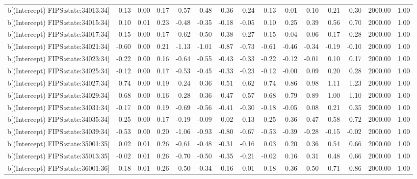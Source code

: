 \begin{table}[ht]
\begin{tabular}{rrrrrrrrrrrrrrr}
  b[(Intercept) FIPS:state:34013:34] & -0.13 & 0.00 & 0.17 & -0.57 & -0.48 & -0.36 & -0.24 & -0.13 & -0.01 & 0.10 & 0.21 & 0.30 & 2000.00 & 1.00 \\ 
  b[(Intercept) FIPS:state:34015:34] & 0.10 & 0.01 & 0.23 & -0.48 & -0.35 & -0.18 & -0.05 & 0.10 & 0.25 & 0.39 & 0.56 & 0.70 & 2000.00 & 1.00 \\ 
  b[(Intercept) FIPS:state:34017:34] & -0.15 & 0.00 & 0.17 & -0.62 & -0.50 & -0.38 & -0.27 & -0.15 & -0.04 & 0.06 & 0.17 & 0.28 & 2000.00 & 1.00 \\ 
  b[(Intercept) FIPS:state:34021:34] & -0.60 & 0.00 & 0.21 & -1.13 & -1.01 & -0.87 & -0.73 & -0.61 & -0.46 & -0.34 & -0.19 & -0.10 & 2000.00 & 1.00 \\ 
  b[(Intercept) FIPS:state:34023:34] & -0.22 & 0.00 & 0.16 & -0.64 & -0.55 & -0.43 & -0.33 & -0.22 & -0.12 & -0.01 & 0.10 & 0.17 & 2000.00 & 1.00 \\ 
  b[(Intercept) FIPS:state:34025:34] & -0.12 & 0.00 & 0.17 & -0.53 & -0.45 & -0.33 & -0.23 & -0.12 & -0.00 & 0.09 & 0.20 & 0.28 & 2000.00 & 1.00 \\ 
  b[(Intercept) FIPS:state:34027:34] & 0.74 & 0.00 & 0.19 & 0.24 & 0.36 & 0.51 & 0.62 & 0.74 & 0.86 & 0.98 & 1.11 & 1.23 & 2000.00 & 1.00 \\ 
  b[(Intercept) FIPS:state:34029:34] & 0.68 & 0.00 & 0.16 & 0.28 & 0.36 & 0.47 & 0.57 & 0.68 & 0.79 & 0.89 & 1.00 & 1.10 & 2000.00 & 1.00 \\ 
  b[(Intercept) FIPS:state:34031:34] & -0.17 & 0.00 & 0.19 & -0.69 & -0.56 & -0.41 & -0.30 & -0.18 & -0.05 & 0.08 & 0.21 & 0.35 & 2000.00 & 1.00 \\ 
  b[(Intercept) FIPS:state:34035:34] & 0.25 & 0.00 & 0.17 & -0.19 & -0.09 & 0.02 & 0.13 & 0.25 & 0.36 & 0.47 & 0.58 & 0.72 & 2000.00 & 1.00 \\ 
  b[(Intercept) FIPS:state:34039:34] & -0.53 & 0.00 & 0.20 & -1.06 & -0.93 & -0.80 & -0.67 & -0.53 & -0.39 & -0.28 & -0.15 & -0.02 & 2000.00 & 1.00 \\ 
  b[(Intercept) FIPS:state:35001:35] & 0.02 & 0.01 & 0.26 & -0.61 & -0.48 & -0.31 & -0.16 & 0.03 & 0.20 & 0.36 & 0.54 & 0.66 & 2000.00 & 1.00 \\ 
  b[(Intercept) FIPS:state:35013:35] & -0.02 & 0.01 & 0.26 & -0.70 & -0.50 & -0.35 & -0.21 & -0.02 & 0.16 & 0.31 & 0.48 & 0.66 & 2000.00 & 1.00 \\ 
  b[(Intercept) FIPS:state:36001:36] & 0.18 & 0.01 & 0.26 & -0.50 & -0.34 & -0.16 & 0.01 & 0.18 & 0.36 & 0.50 & 0.71 & 0.86 & 2000.00 & 1.00 \\ 

\end{tabular}
\end{table}
